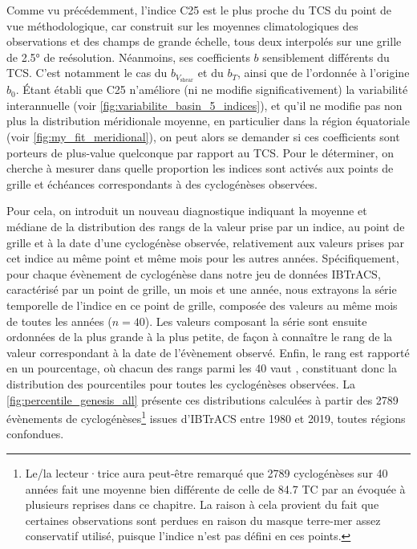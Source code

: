 \documentclass[../main.tex]{subfiles}
\begin{document}
Comme vu précédemment, l'indice C25 est le plus proche du TCS du point de vue méthodologique, car construit sur les moyennes climatologiques des observations et
des champs de grande échelle, tous deux interpolés sur une grille de \ang{2.5} de reésolution. Néanmoins, ses coefficients $b$ sensiblement différents du TCS.
C'est notamment le cas du $b_{V_{\mathrm{shear}}}$ et du $b_T$, ainsi que de l'ordonnée à l'origine $b_0$. Étant établi que C25 n'améliore (ni ne modifie
significativement) la variabilité interannuelle (voir \cref{fig:variabilite_basin_5_indices}), et qu'il ne modifie pas non plus la distribution méridionale
moyenne, en particulier dans la région équatoriale (voir \cref{fig:my_fit_meridional}), on peut alors se demander si ces coefficients sont porteurs de
plus-value quelconque par rapport au TCS. Pour le déterminer, on cherche à mesurer dans quelle proportion les indices sont activés aux points de grille et
échéances correspondants à des cyclogénèses observées.

Pour cela, on introduit un nouveau diagnostique indiquant la moyenne et médiane de la distribution des rangs de la valeur prise par un indice, au point de
grille et à la date d'une cyclogénèse observée, relativement aux valeurs prises par cet indice au même point et même mois pour les autres années.
Spécifiquement, pour chaque évènement de cyclogénèse dans notre jeu de données IBTrACS, caractérisé par un point de grille, un mois et une année, nous extrayons
la série temporelle de l'indice en ce point de grille, composée des valeurs au même mois de toutes les années ($n = \num{40}$). Les valeurs composant la série
sont ensuite ordonnées de la plus grande à la plus petite, de façon à connaître le rang de la valeur correspondant à la date de l'évènement observé. Enfin, le
rang est rapporté en un pourcentage, où chacun des rangs parmi les \num{40} vaut , constituant donc la distribution des pourcentiles pour toutes les
cyclogénèses observées. La \cref{fig:percentile_genesis_all} présente ces distributions calculées à partir des \num{2789} évènements de
cyclogénèses\footnote{Le/la lecteur·trice aura peut-être remarqué que \num{2789} cyclogénèses sur \num{40} années fait une moyenne bien différente de celle de
\num{84.7} TC par an évoquée à plusieurs reprises dans ce chapitre. La raison à cela provient du fait que certaines observations sont perdues en raison du
masque terre-mer assez conservatif utilisé, puisque l'indice n'est pas défini en ces points.} issues d'IBTrACS entre \num{1980} et \num{2019}, toutes
régions confondues.
\end{document}
